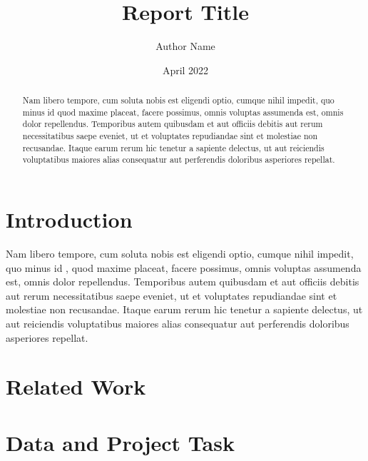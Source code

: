 \documentclass{article}
\title{Report Title}
\author{Author Name }
\date{April 2022}
\begin{document}
\maketitle
\newpage
\tableofcontents
\newpage
\begin{abstract}
    Nam libero tempore, cum soluta nobis est eligendi optio, cumque nihil impedit, quo minus id quod maxime placeat, facere possimus, omnis voluptas assumenda est, omnis dolor repellendus. Temporibus autem quibusdam et aut officiis debitis aut rerum necessitatibus saepe eveniet, ut et voluptates repudiandae sint et molestiae non recusandae. Itaque earum rerum hic tenetur a sapiente delectus, ut aut reiciendis voluptatibus maiores alias consequatur aut perferendis doloribus asperiores repellat.
\end{abstract}
\newpage

\section{Introduction}
Nam libero tempore, cum soluta nobis est eligendi optio, cumque nihil impedit, quo minus id \citet{CG20}, quod maxime placeat, facere possimus, omnis voluptas assumenda est, omnis dolor repellendus. Temporibus autem quibusdam et aut officiis debitis aut rerum necessitatibus saepe eveniet, ut et voluptates repudiandae sint et molestiae non recusandae. Itaque earum rerum hic tenetur a sapiente delectus, ut aut reiciendis voluptatibus maiores alias consequatur aut perferendis doloribus asperiores repellat.

\section{Related Work}

\section{Data and Project Task}
\end{document}
